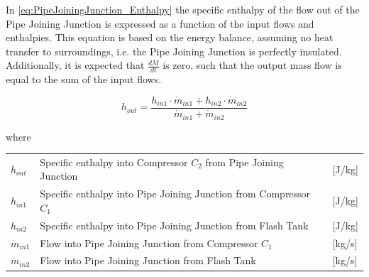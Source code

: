 In \cref{eq:PipeJoiningJunction_Enthalpy} the specific enthalpy of the flow out of the Pipe Joining Junction is expressed as a function of the input flows and enthalpies. This equation is based on the energy balance, assuming no heat transfer to surroundings, i.e. the Pipe Joining Junction is perfectly insulated. Additionally, it is expected that $\frac{dM}{dt}$ is zero, such that the output mass flow is equal to the sum of the input flows.

\begin{equation} \label{eq:PipeJoiningJunction_Enthalpy}
	h_{out} = \frac{h_{in1} \cdot \dot{m}_{in1} + h_{in2} \cdot \dot{m}_{in2}}{ \dot{m}_{in1} + \dot{m}_{in2} }
\end{equation}

where

\begin{center}
	\begin{tabular}{l p{10cm} l}
		$h_{out}$       & Specific enthalpy into Compressor $ C_2 $ from Pipe Joining Junction & [\si{J}/\si{kg}] \\
		$h_{in1}$       & Specific enthalpy into Pipe Joining Junction from Compressor $ C_1 $ & [\si{J}/\si{kg}] \\
		$h_{in2}$       & Specific enthalpy into Pipe Joining Junction from Flash Tank         & [\si{J}/\si{kg}] \\
		$\dot{m}_{in1}$ & Flow into Pipe Joining Junction from Compressor $ C_1 $              & [\si{kg}/\si{s}] \\
		$\dot{m}_{in2}$ & Flow into Pipe Joining Junction from Flash Tank                      & [\si{kg}/\si{s}]
	\end{tabular}
\end{center}



